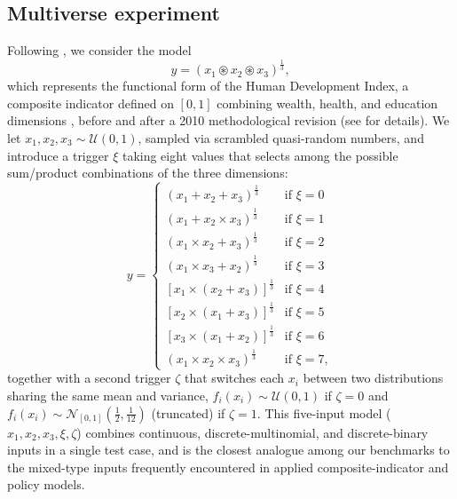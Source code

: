 \documentclass[12pt]{article}
\begin{document}
\subsection{Multiverse experiment}
\label{Multiverse}

Following \citet{saltelli2025}, we consider the model
\begin{equation*}
    y = (x_1 \circledast x_2 \circledast x_3)^{\frac{1}{3}},
\end{equation*}
which represents the functional form of the Human Development Index, a composite indicator defined on $[0,1]$ combining wealth, health, and education dimensions \citep{United_Nations_2024}, before and after a 2010 methodological revision (see \citealp{Paruolo_Saisana_Saltelli_2013} for details). We let $x_1, x_2, x_3 \sim \mathscr{U}(0,1)$, sampled via scrambled quasi-random numbers, and introduce a trigger $\xi$ taking eight values that selects among the possible sum/product combinations of the three dimensions:
\begin{equation*}
    y =
    \begin{cases}
        (x_1 + x_2 + x_3)^{\frac{1}{3}}           & \text{if } \xi=0 \\
        (x_1 + x_2 \times x_3)^{\frac{1}{3}}      & \text{if } \xi=1 \\
        (x_1 \times x_2 + x_3)^{\frac{1}{3}}      & \text{if } \xi=2 \\
        (x_1 \times x_3 + x_2)^{\frac{1}{3}}      & \text{if } \xi=3 \\
        [x_1 \times (x_2 + x_3)]^{\frac{1}{3}}    & \text{if } \xi=4 \\
        [x_2 \times (x_1 + x_3)]^{\frac{1}{3}}    & \text{if } \xi=5 \\
        [x_3 \times (x_1 + x_2)]^{\frac{1}{3}}    & \text{if } \xi=6 \\
        (x_1 \times x_2 \times x_3)^{\frac{1}{3}} & \text{if } \xi=7,
    \end{cases}
\end{equation*}
together with a second trigger $\zeta$ that switches each $x_i$ between two distributions sharing the same mean and variance, $f_i(x_i)\sim\mathscr U(0,1)$ if $\zeta=0$ and $f_i(x_i)\sim\mathscr N_{[0,1]}(\tfrac12,\tfrac1{12})$ (truncated) if $\zeta=1$. This five-input model ($x_1,x_2,x_3,\xi,\zeta$) combines continuous, discrete-multinomial, and discrete-binary inputs in a single test case, and is the closest analogue among our benchmarks to the mixed-type inputs frequently encountered in applied composite-indicator and policy models.
\end{document}
